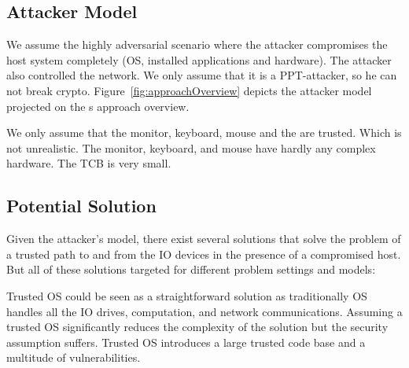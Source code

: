 \subsection{Attacker Model}

We assume the highly adversarial scenario where the attacker compromises the host system completely (OS, installed applications and hardware). The attacker also controlled the network. We only assume that it is a PPT-attacker, so he can not break crypto. Figure~\ref{fig:approachOverview} depicts the attacker model projected on the \name{}s approach overview.

We only assume that the monitor, keyboard, mouse and the \device are trusted. Which is not unrealistic. The monitor, keyboard, and mouse have hardly any complex hardware. The TCB is very small.

\iffalse
\myparagraph{Advantages}

\begin{enumerate}
  \item The \device does not need to know the formatting/template of the page. As the \device only looks to the current mouse position, the structure of the page is somewhat irrelevant (?).
\end{enumerate}
\fi


\subsection{Potential Solution}

Given the attacker's model, there exist several solutions that solve the problem of a trusted path to and from the IO devices in the presence of a compromised host. But all of these solutions targeted for different problem settings and models:

 Trusted OS could be seen as a straightforward solution as traditionally OS handles all the IO drives, computation, and network communications. Assuming a trusted OS significantly reduces the complexity of the solution but the security assumption suffers. Trusted OS introduces a large trusted code base and a multitude of vulnerabilities. 


